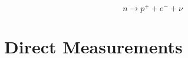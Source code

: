 \begin{equation}
    n \rightarrow p^+ + e^- + \nu
    \label{semi_modern_beta_decay}
\end{equation}

\section{Direct Measurements}\label{Direct_Measurements_section}

